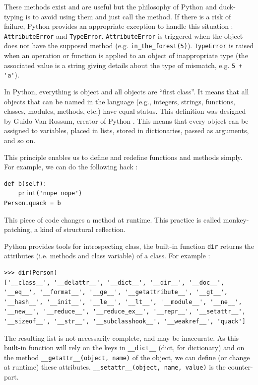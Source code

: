 \documentclass[a4paper,10pt]{article}
\begin{document}
These methods exist and are useful but the philosophy of Python and duck-typing is to avoid using them and just call the method.
If there is a risk of failure, Python provides an appropriate exception to handle this situation : \lstinline|AttributeError| and \lstinline|TypeError|.
\lstinline|AttributeError| is triggered when the object does not have the supposed method (e.g. \lstinline|in_the_forest(5)|).
\lstinline|TypeError| is raised when an operation or function is applied to an object of inappropriate type (the associated value is a string giving details about the type of mismatch, e.g. \mbox{\lstinline|5 + 'a'|}).

In Python, everything is object and all objects are ``first class''.
It means that all objects that can be named in the language (e.g., integers, strings, functions, classes, modules, methods, etc.) have equal status.
This definition was designed by Guido Van Rossum, creator of Python \cite{ wiki:python}.
This means that every object can be assigned to variables, placed in lists, stored in dictionaries, passed as arguments, and so on.

This principle enables us to define and redefine functions and methods simply. For example, we can do the following hack :

\begin{lstlisting}
def b(self):
    print('nope nope')
Person.quack = b
\end{lstlisting}


This piece of code changes a method at runtime. This practice is called monkey-patching, a kind of structural reflection.

Python provides tools for introspecting class, the built-in function \lstinline|dir| returns the attributes (i.e. methods and class variable) of a class. For example :
\begin{lstlisting}
>>> dir(Person)
['__class__', '__delattr__', '__dict__', '__dir__', '__doc__', '__eq__', '__format__', '__ge__', '__getattribute__', '__gt__', '__hash__', '__init__', '__le__', '__lt__', '__module__', '__ne__', '__new__', '__reduce__', '__reduce_ex__', '__repr__', '__setattr__', '__sizeof__', '__str__', '__subclasshook__', '__weakref__', 'quack']
\end{lstlisting}

The resulting list is not necessarily complete, and may be inaccurate. As this built-in function will rely on the keys in \lstinline|__dict__| (dict, for dictionary) and on the method \lstinline|__getattr__(object, name)| of the object, we can define (or change at runtime) these attributes. \lstinline|__setattr__(object, name, value)| is the counter-part.
\end{document}
